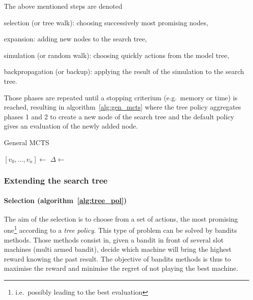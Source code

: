 \documentclass[oneside,twocolumn]{article}
\begin{document}
The above mentioned steps are denoted
\begin{compactenum}
\item selection (or tree walk): choosing successively most promising nodes,
\item expansion: adding new nodes to the search tree,
\item simulation (or random walk): choosing quickly actions from the model
  tree,
\item backpropagation (or backup): applying the result of the simulation to
  the search tree.
\end{compactenum}
Those phases are repeated until a stopping criterium (e.g.\ memory or time) is
reached, resulting in algorithm~\ref{alg:gen_mcts} where the tree policy
aggregates phases 1 and 2 to create a new node of the search tree and the
default policy gives an evaluation of the newly added node.
\begin{algorithm}
  \caption{General MCTS~\cite{browne2012survey}}\label{alg:gen_mcts}
  \begin{algorithmic}
    \State{} \([v_0, \dots, v_n] \gets\) 
    \State{} \(\Delta \gets\) 
    \State{} 
    \EndWhile{}
    \EndProcedure{}
  \end{algorithmic}
\end{algorithm}

\subsubsection{Extending the search tree}
\paragraph{Selection (algorithm~\ref{alg:tree_pol})}
The aim of the selection is to choose from a set of actions, the most promising
one\footnote{i.e.\ possibly leading to the best evaluation} according to a
\emph{tree policy}. This type of problem can be solved by bandits methods. Those
methods consist in, given a bandit in front of several slot machines (multi
armed bandit), decide which machine will bring the highest reward knowing the
past result. The objective of bandits methods is thus to maximise the reward and
minimise the regret of not playing the best machine.
\end{document}
